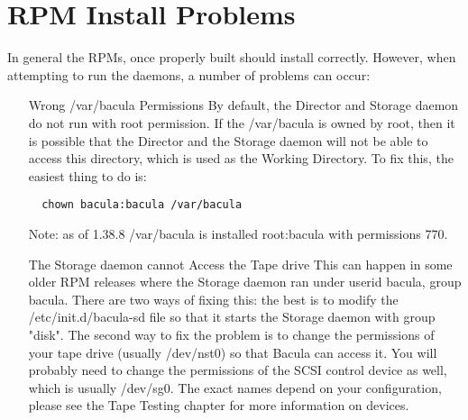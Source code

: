 \section{RPM Install Problems}
In general the RPMs, once properly built should install correctly.
However, when attempting to run the daemons, a number of problems
can occur:
\begin{itemize}
\item [Wrong /var/bacula Permissions]
  By default, the Director and Storage daemon do not run with
  root permission. If the /var/bacula is owned by root, then it
  is possible that the Director and the Storage daemon will not
  be able to access this directory, which is used as the Working
  Directory. To fix this, the easiest thing to do is:
\begin{verbatim}
  chown bacula:bacula /var/bacula
\end{verbatim}
  Note: as of 1.38.8 /var/bacula is installed root:bacula with
  permissions 770.
\item [The Storage daemon cannot Access the Tape drive]
  This can happen in some older RPM releases where the Storage
  daemon ran under userid bacula, group bacula.  There are two
  ways of fixing this: the best is to modify the /etc/init.d/bacula-sd
  file so that it starts the Storage daemon with group "disk".
  The second way to fix the problem is to change the permissions
  of your tape drive (usually /dev/nst0) so that Bacula can access it.
  You will probably need to change the permissions of the SCSI control
  device as well, which is usually /dev/sg0.  The exact names depend
  on your configuration, please see the Tape Testing chapter for
  more information on devices.
\end{itemize}
 
